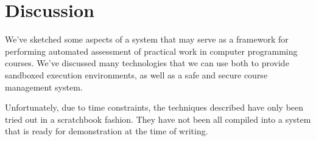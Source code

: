 
\chapter{Discussion}

\label{section:discussion}

We've sketched some aspects of a system that may serve as a framework for
performing automated assessment of practical work in computer programming
courses. We've discussed many technologies that we can use both to provide
sandboxed execution environments, as well as a safe and secure course
management system. 

Unfortunately, due to time constraints, the techniques described have only been
tried out in a scratchbook fashion. They have not been all compiled into a
system that is ready for demonstration at the time of writing.













